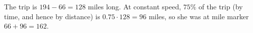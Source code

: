 The trip is $194-66=128$ miles long. At constant speed, $75\%$ of the trip (by time, and hence by distance) is $0.75\cdot128=96$ miles, so she was at mile marker $66+96=\boxed{162}$.
